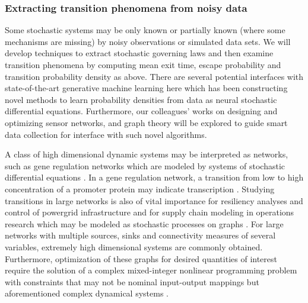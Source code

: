 \documentclass[11pt]{NSFamsart}
\begin{document}
\subsubsection*{Extracting transition phenomena from noisy data}
Some   stochastic systems may be only known or partially known (where some mechanisms are missing) by   noisy observations or simulated data sets. We will  develop techniques to extract stochastic governing laws \cite{YangLi2020a} and then examine transition phenomena by computing mean exit time, escape probability and transition probability density as above. 
There are several potential interfaces with state-of-the-art generative machine learning here which has been constructing novel methods to learn probability densities from data as neural stochastic differential equations. Furthermore, our colleagues'  works on 
designing and optimizing sensor networks, and graph theory \cite{karwa2016statistical,Calines2008MonitoringSF} will be explored to guide smart data collection for interface with such novel algorithms. 


A class of high dimensional dynamic systems may be interpreted as networks, such as   gene regulation networks \cite{Raser2005} which are modeled by systems of stochastic differential equations \cite{Suel06}.  In a gene regulation network, a transition from low to high concentration of a promoter protein may indicate transcription \cite{Stefan,ZLDK}. Studying transitions in large networks is also of vital importance for resiliency analyses and control of powergrid infrastructure and for supply chain modeling in operations research which may be modeled as stochastic processes on graphs \cite{shin2020graph,anghel2007stochastic,nardelli2014models}. For large networks with multiple sources, sinks and connectivity measures of several variables, extremely high dimensional systems are commonly obtained. Furthermore, optimization of these graphs for desired quantities of interest require the solution of a complex mixed-integer nonlinear programming problem with constraints that may not be nominal input-output mappings but aforementioned complex dynamical systems \cite{shin2020decentralized,sampat2017optimization,kim2019graph,shin2021exponential}.
\end{document}

